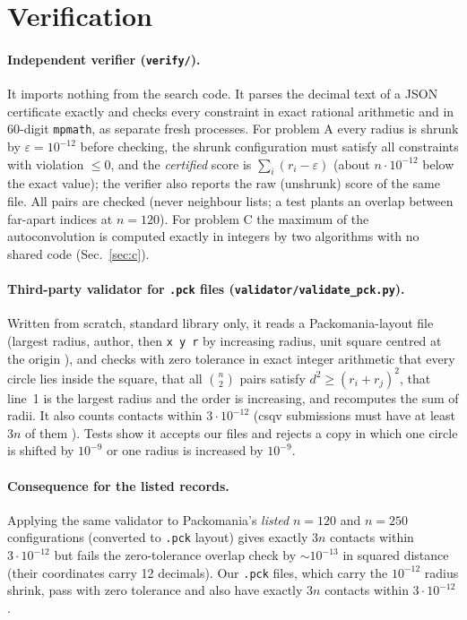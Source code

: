\documentclass[10pt]{article}
\begin{document}
\section{Verification}\label{sec:verify}
\paragraph{Independent verifier (\texttt{verify/}).} It imports nothing from the search code. It parses the decimal text of a JSON certificate exactly and checks every constraint
in exact rational arithmetic and in 60-digit \texttt{mpmath}, as separate fresh processes. For problem A every radius is shrunk by $\varepsilon=10^{-12}$ before checking, the
shrunk configuration must satisfy all constraints with violation $\le0$, and the \emph{certified} score is $\sum_i(r_i-\varepsilon)$ (about $n\cdot10^{-12}$ below the exact value); the verifier also reports the raw
(unshrunk) score of the same file. All pairs are checked (never neighbour lists; a test plants an overlap between far-apart indices at $n=120$). For problem C the maximum of the autoconvolution is computed exactly in integers by two algorithms with no shared code (Sec.~\ref{sec:c}).
\paragraph{Third-party validator for \texttt{.pck} files (\texttt{validator/validate\_pck.py}).} Written from scratch, standard library only, it reads a Packomania-layout file
(largest radius, author, then \texttt{x y r} by increasing radius, unit square centred at the origin \cite{packomania}), and checks with zero tolerance in exact integer arithmetic that every circle lies inside the square,
that all $\binom n2$ pairs satisfy $d^2\ge(r_i+r_j)^2$, that line~1 is the largest radius and the order is increasing, and recomputes the sum of radii. It also counts contacts within $3\cdot10^{-12}$ (csqv submissions must have at least $3n$ of them \cite{packomania}).
Tests show it accepts our files and rejects a copy in which one circle is shifted by $10^{-9}$ or one radius is increased by $10^{-9}$.
\paragraph{Consequence for the listed records.} Applying the same validator to Packomania's \emph{listed} $n=120$ and $n=250$ configurations (converted to \texttt{.pck} layout) gives exactly $3n$ contacts within $3\cdot10^{-12}$ but fails the zero-tolerance
overlap check by $\sim10^{-13}$ in squared distance (their coordinates carry 12 decimals). Our \texttt{.pck} files, which carry the $10^{-12}$ radius shrink, pass with zero tolerance and also have exactly $3n$ contacts within $3\cdot10^{-12}$.
\end{document}
